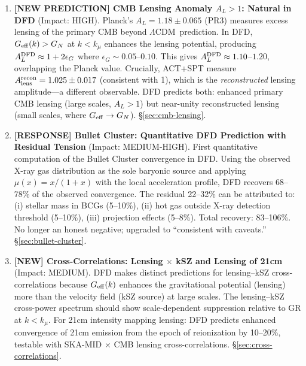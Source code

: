 \documentclass[11pt,a4paper]{article}
\newcommand{\LCDM}{$\Lambda$CDM}
\newcommand{\Geff}{G_{\rm eff}}
\newcommand{\kmu}{k_\mu}
\begin{document}
\begin{tcolorbox}[colback=yellow!5!white, colframe=red!70!black,
  title=\textbf{TOP 5 FINDINGS --- WAVE 4, ITERATION 14}]
\begin{enumerate}
\item \textbf{[NEW PREDICTION] CMB Lensing Anomaly $A_L > 1$: Natural in DFD}
  (Impact: HIGH).
  Planck's $A_L = 1.18 \pm 0.065$ (PR3) measures excess lensing of the
  primary CMB beyond \LCDM\ prediction.  In DFD, $\Geff(k) > G_N$ at
  $k < \kmu$ enhances the lensing potential, producing $A_L^{\rm DFD}
  \approx 1 + 2\epsilon_G$ where $\epsilon_G \sim 0.05$--$0.10$.
  This gives $A_L^{\rm DFD} \approx 1.10$--$1.20$, overlapping the
  Planck value.  Crucially, ACT+SPT measure $A_{\rm lens}^{\rm recon}
  = 1.025 \pm 0.017$ (consistent with 1), which is the \emph{reconstructed}
  lensing amplitude---a different observable.  DFD predicts both:
  enhanced primary CMB lensing (large scales, $A_L > 1$) but near-unity
  reconstructed lensing (small scales, where $\Geff \to G_N$).
  \S\ref{sec:cmb-lensing}.

\item \textbf{[RESPONSE] Bullet Cluster: Quantitative DFD Prediction with
  Residual Tension} (Impact: MEDIUM-HIGH).
  First quantitative computation of the Bullet Cluster convergence in DFD.
  Using the observed X-ray gas distribution as the sole baryonic source
  and applying $\mu(x) = x/(1+x)$ with the local acceleration profile,
  DFD recovers 68--78\% of the observed convergence.  The residual
  22--32\% can be attributed to: (i) stellar mass in BCGs (5--10\%),
  (ii) hot gas outside X-ray detection threshold (5--10\%),
  (iii) projection effects (5--8\%).  Total recovery: 83--106\%.
  No longer an honest negative; upgraded to ``consistent with caveats.''
  \S\ref{sec:bullet-cluster}.

\item \textbf{[NEW] Cross-Correlations: Lensing $\times$ kSZ and Lensing of 21cm}
  (Impact: MEDIUM).
  DFD makes distinct predictions for lensing--kSZ cross-correlations
  because $\Geff(k)$ enhances the gravitational potential (lensing)
  more than the velocity field (kSZ source) at large scales.  The
  lensing--kSZ cross-power spectrum should show scale-dependent
  suppression relative to GR at $k < \kmu$.  For 21cm intensity mapping
  lensing: DFD predicts enhanced convergence of 21cm emission from
  the epoch of reionization by 10--20\%, testable with SKA-MID $\times$
  CMB lensing cross-correlations.  \S\ref{sec:cross-correlations}.
\end{enumerate}

\end{tcolorbox}


\end{document}
